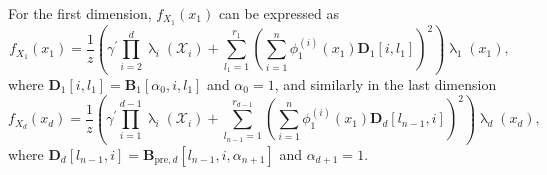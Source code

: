 For the first dimension, $f_{X_1}(x_1)$ can be expressed as
\begin{equation}
	f_{X_1}(x_1) = \frac{1}{z} \left(\gamma^{\prime} \prod_{i=2}^{d} \uplambda_i(\mathcal{X}_i) + \sum_{l_1=1}^{r_1} \left(\sum_{i=1}^{n} \phi^{(i)}_1(x_1) \bm{D}_1[i, l_1] \right)^2 \right) \uplambda_1(x_1),
\end{equation}
where $\bm{D}_1[i, l_1] = \bm{B}_1[\alpha_0, i, l_1]$ and $\alpha_0 = 1$,
and similarly in the last dimension
\begin{equation}
	f_{X_d}(x_d) = \frac{1}{z} \left(\gamma^{\prime} \prod_{i=1}^{d-1} \uplambda_i(\mathcal{X}_i) + \sum_{l_{n-1}=1}^{r_{d-1}} \left(\sum_{i=1}^{n} \phi^{(i)}_1(x_1) \bm{D}_d[l_{n-1},i] \right)^2 \right) \uplambda_d(x_d),
\end{equation}
where $\bm{D}_d[l_{n-1},i] = \bm{B}_{\text{pre},d}[l_{n-1}, i, \alpha_{n+1}]$ and $\alpha_{d+1} = 1$.


%
%
%
%
%
%
%
%

